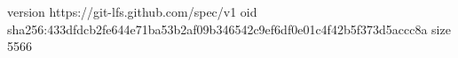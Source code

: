 version https://git-lfs.github.com/spec/v1
oid sha256:433dfdcb2fe644e71ba53b2af09b346542c9ef6df0e01c4f42b5f373d5accc8a
size 5566
